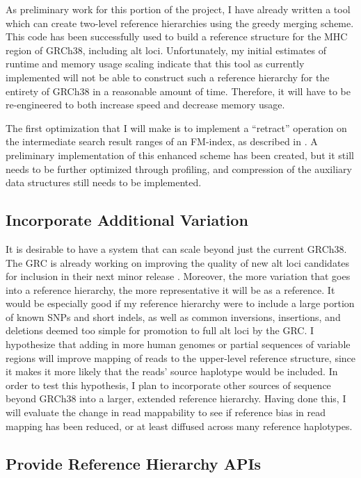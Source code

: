 \documentclass[11pt,proposal]{ucthesis}
\begin{document}
As preliminary work for this portion of the project, I have already written a tool which can create two-level reference hierarchies using the greedy merging scheme. This code has been successfully used to build a reference structure for the MHC region of GRCh38, including alt loci. Unfortunately, my initial estimates of runtime and memory usage scaling indicate that this tool as currently implemented will not be able to construct such a reference hierarchy for the entirety of GRCh38 in a reasonable amount of time. Therefore, it will have to be re-engineered to both increase speed and decrease memory usage.

The first optimization that I will make is to implement a ``retract'' operation on the intermediate search result ranges of an FM-index, as described in \cite{fischer2008other}. A preliminary implementation of this enhanced scheme has been created, but it still needs to be further optimized through profiling, and compression of the auxiliary data structures still needs to be implemented.

\subsection{Incorporate Additional Variation}
\label{subsec:aim2variation}

It is desirable to have a system that can scale beyond just the current GRCh38. The GRC is already working on improving the quality of new alt loci candidates for inclusion in their next minor release \cite{church2014story}. Moreover, the more variation that goes into a reference hierarchy, the more representative it will be as a reference. It would be especially good if my reference hierarchy were to include a large portion of known SNPs and short indels, as well as common inversions, insertions, and deletions deemed too simple for promotion to full alt loci by the GRC. I hypothesize that adding in more human genomes or partial sequences of variable regions will improve mapping of reads to the upper-level reference structure, since it makes it more likely that the reads' source haplotype would be included. In order to test this hypothesis, I plan to incorporate other sources of sequence beyond GRCh38 into a larger, extended reference hierarchy. Having done this, I will evaluate the change in read mappability to see if reference bias in read mapping has been reduced, or at least diffused across many reference haplotypes.

\subsection{Provide Reference Hierarchy APIs}
\label{subsec:aim2api}
\end{document}
